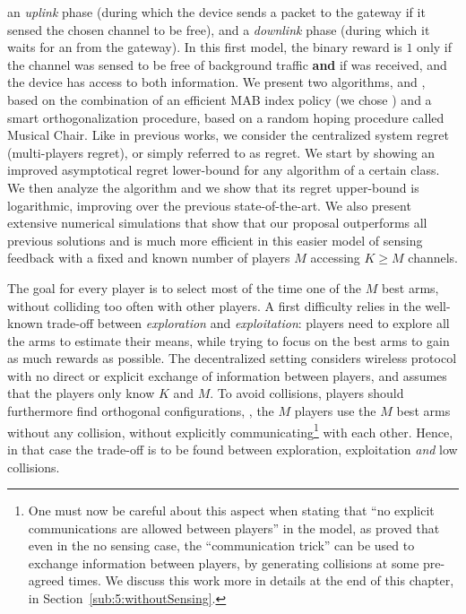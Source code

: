 an \emph{uplink} phase (during which the device sends a packet to the gateway if it sensed the chosen channel to be free),
and a \emph{downlink} phase (during which it waits for an \Ack{} from the gateway).
In this first model, the binary reward is $1$ only if the channel was sensed to be free of background traffic \textbf{and} if \Ack{} was received, and the device has access to both information.
We present two algorithms, \RandTopM{} and \MCTopM, based on the combination of an efficient MAB index policy (we chose \klUCB) and a smart orthogonalization procedure, based on a random hoping procedure called Musical Chair.
Like in previous works, we consider the centralized system regret (multi-players regret), or simply referred to as regret.
We start by showing an improved asymptotical regret lower-bound for any algorithm of a certain class.
We then analyze the \MCTopM{} algorithm and we show that its regret upper-bound is logarithmic, improving over the previous state-of-the-art.
We also present extensive numerical simulations that show that our proposal outperforms all previous solutions and is much more efficient in this easier model of sensing feedback with a fixed and known number of players $M$ accessing $K \geq M$ channels.



The goal for every player is to select most of the time one of the $M$ best arms, without colliding too often with other players.
A first difficulty relies in the well-known trade-off between \emph{exploration} and \emph{exploitation}: players need to explore all the arms to estimate their means, while trying to focus on the best arms to gain as much rewards as possible.
The decentralized setting considers wireless protocol with no direct or explicit exchange of information between players, and assumes that the players only know $K$ and $M$. To avoid collisions, players should furthermore find orthogonal configurations, \ie, the $M$ players use the $M$ best arms without any collision, without explicitly communicating\footnote{One must now be careful about this aspect when stating that ``no explicit communications are allowed between players'' in the model, as \cite{BoursierPerchet18} proved that even in the no sensing case, the ``communication trick'' can be used to exchange information between players, by generating collisions at some pre-agreed times. We discuss this work more in details at the end of this chapter, in Section~\ref{sub:5:withoutSensing}.} with each other.
Hence, in that case the trade-off is to be found between exploration, exploitation \emph{and} low collisions.

